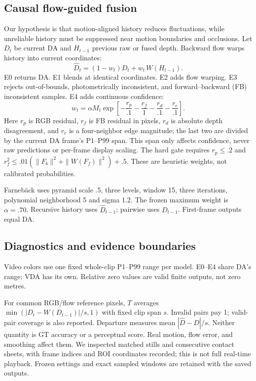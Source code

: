 \documentclass[10pt,twocolumn,letterpaper]{article}
\begin{document}
\subsection{Causal flow-guided fusion}
Our hypothesis is that motion-aligned history reduces fluctuations, while unreliable history must be suppressed near motion boundaries and occlusions. Let $D_t$ be current DA and $H_{t-1}$ previous raw or fused depth. Backward flow warps history into current coordinates:
\begin{equation}
\widehat D_t=(1-w_t)D_t+w_t\,W(H_{t-1}).
\end{equation}
E0 returns DA. E1 blends at identical coordinates. E2 adds flow warping. E3 rejects out-of-bounds, photometrically inconsistent, and forward--backward (FB) inconsistent samples. E4 adds continuous confidence:
\begin{equation}
w_t=\alpha M_t\exp\!\left[-\frac{r_p}{.1}-\frac{r_f}{1}
-\frac{r_d}{.1}-\frac{r_e}{.1}\right].
\label{eq:confidence}
\end{equation}
Here $r_p$ is RGB residual, $r_f$ is FB residual in pixels, $r_d$ is absolute depth disagreement, and $r_e$ is a four-neighbor edge magnitude; the last two are divided by the current DA frame's P1--P99 span. This span only affects confidence, never raw predictions or per-frame display scaling. The hard gate requires $r_p\le.2$ and $r_f^2\le.01(\|F_b\|^2+\|W(F_f)\|^2)+.5$. These are heuristic weights, not calibrated probabilities.

Farneb\"ack uses pyramid scale .5, three levels, window 15, three iterations, polynomial neighborhood 5 and sigma 1.2. The frozen maximum weight is $\alpha=.70$. Recursive history uses $\widehat D_{t-1}$; pairwise uses $D_{t-1}$. First-frame outputs equal DA.

\subsection{Diagnostics and evidence boundaries}
Video colors use one fixed whole-clip P1--P99 range per model. E0--E4 share DA's range; VDA has its own. Relative zero values are valid finite outputs, not zero metres.

For common RGB/flow reference pixels, $T$ averages $\min(|D_t-W(D_{t-1})|/s,1)$ with fixed clip span $s$. Invalid pairs pay 1; valid-pair coverage is also reported. Departure measures mean $|\widehat D-D|/s$. Neither quantity is GT accuracy or a perceptual score. Real motion, flow error, and smoothing affect them. We inspected matched stills and consecutive contact sheets, with frame indices and ROI coordinates recorded; this is not full real-time playback. Frozen settings and exact sampled windows are retained with the saved outputs.
\end{document}
